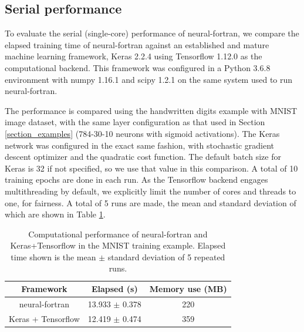 \documentclass[sigplan, review=false, screen=true, balance=true]{acmart}
\begin{document}
\subsection{Serial performance}

To evaluate the serial (single-core) performance of neural-fortran,
we compare the elapsed training time of neural-fortran against an established
and mature machine learning framework, Keras 2.2.4 \citep{chollet15} using
Tensorflow 1.12.0 \citep{abadi16} as the computational backend. This framework
was configured in a Python 3.6.8 environment with numpy 1.16.1 and scipy 1.2.1
on the same system used to run neural-fortran.

The performance is compared using the handwritten digits example
with MNIST image dataset, with the same layer configuration as that used
in Section \ref{section_examples} (784-30-10 neurons with sigmoid activations).
The Keras network was configured in the exact same fashion, with stochastic
gradient descent optimizer and the quadratic cost function. The default batch
size for Keras is 32 if not specified, so we use that value in this comparison.
A total of 10 training epochs are done in each run.
As the Tensorflow backend engages multithreading by default, we explicitly
limit the number of cores and threads to one, for fairness.
A total of 5 runs are made, the mean and standard deviation of which are shown
in Table \ref{serial_table}.

\begin{center}
\begin{table}[h]
\caption{Computational performance of neural-fortran and Keras+Tensorflow
         in the MNIST training example. Elapsed time shown is the mean $\pm$
         standard deviation of 5 repeated runs.}
\label{serial_table}
\begin{tabular}{c|c|c}
  \hline
  Framework & Elapsed (s) & Memory use (MB) \\
  \hline
  neural-fortran     & 13.933 $\pm$ 0.378 & 220 \\
  Keras + Tensorflow & 12.419 $\pm$ 0.474 & 359 \\
  \hline
\end{tabular}
\end{table}
\end{center}
\end{document}
